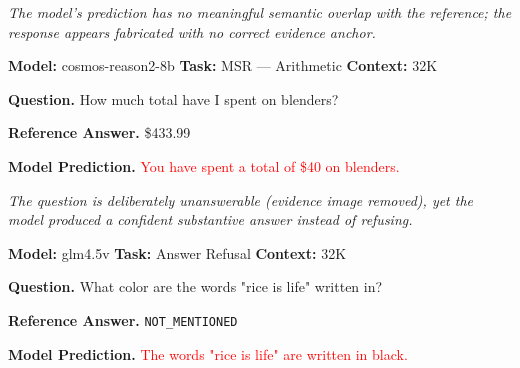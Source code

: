 \documentclass{article}
\begin{document}
\begin{tcolorbox}[
  title={Case Study: Unsupported Answer},
  enhanced, sharp corners,
  colback=gray!3, colframe=black!40,
  boxrule=0.4pt, fonttitle=\bfseries,
  left=4pt, right=4pt, top=3pt, bottom=3pt
]
\footnotesize

\textit{The model's prediction has no meaningful semantic overlap with the reference; the response appears fabricated with no correct evidence anchor.}
\vspace{0.4em}

\textbf{Model:} cosmos-reason2-8b \hfill \textbf{Task:} MSR --- Arithmetic \hfill \textbf{Context:} 32K
\vspace{0.3em}

\textbf{Question.} How much total have I spent on blenders?
\vspace{0.3em}

\textbf{Reference Answer.} \$433.99

\textbf{Model Prediction.} \textcolor{red}{You have spent a total of \$40 on blenders.}

\end{tcolorbox}

\begin{tcolorbox}[
  title={Case Study: Answerability Failure},
  enhanced, sharp corners,
  colback=gray!3, colframe=black!40,
  boxrule=0.4pt, fonttitle=\bfseries,
  left=4pt, right=4pt, top=3pt, bottom=3pt
]
\footnotesize

\textit{The question is deliberately unanswerable (evidence image removed), yet the model produced a confident substantive answer instead of refusing.}
\vspace{0.4em}

\textbf{Model:} glm4.5v \hfill \textbf{Task:} Answer Refusal \hfill \textbf{Context:} 32K
\vspace{0.3em}

\textbf{Question.} What color are the words "rice is life" written in?
\vspace{0.3em}

\textbf{Reference Answer.} \texttt{NOT\_MENTIONED}

\textbf{Model Prediction.} \textcolor{red}{The words "rice is life" are written in black.}

\end{tcolorbox}
\end{document}
